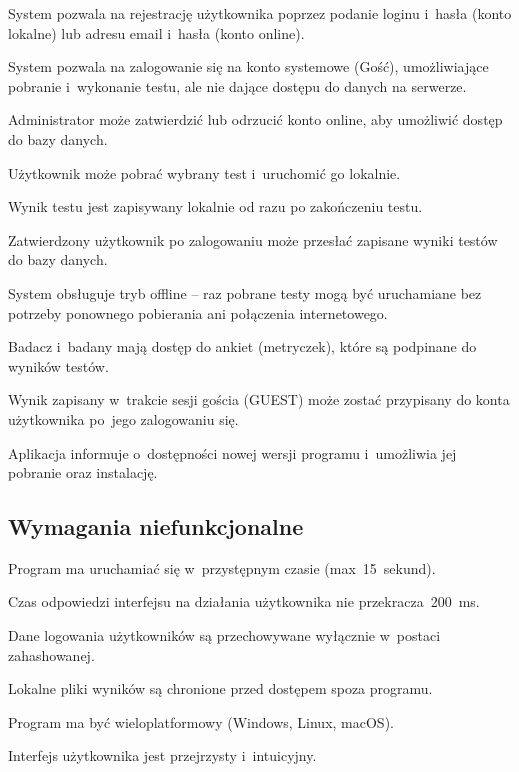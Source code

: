 \documentclass[12pt, a4paper, oneside]{report}
\begin{document}
\begin{description}[noitemsep]
	\item[WF1:] System pozwala na rejestrację użytkownika poprzez podanie loginu i~hasła (konto lokalne) lub adresu email i~hasła (konto online).
	\item[WF2:] System pozwala na zalogowanie się na konto systemowe (Gość), umożliwiające pobranie i~wykonanie testu, ale nie dające dostępu do danych na serwerze.
	\item[WF3:] Administrator może zatwierdzić lub odrzucić konto online, aby umożliwić dostęp do bazy danych.
	\item[WF4:] Użytkownik może pobrać wybrany test i~uruchomić go lokalnie.
	\item[WF5:] Wynik testu jest zapisywany lokalnie od razu po zakończeniu testu.
	\item[WF6:] Zatwierdzony użytkownik po zalogowaniu może przesłać zapisane wyniki testów do bazy danych.
	\item[WF7:] System obsługuje tryb offline -- raz pobrane testy mogą być uruchamiane bez potrzeby ponownego pobierania ani połączenia internetowego.
	\item[WF8:] Badacz i~badany mają dostęp do ankiet (metryczek), które są podpinane do wyników testów.
	\item[WF9:] Wynik zapisany w~trakcie sesji gościa (GUEST) może zostać przypisany do konta użytkownika po~jego zalogowaniu się.
	\item[WF10:] Aplikacja informuje o~dostępności nowej wersji programu i~umożliwia jej pobranie oraz instalację.
\end{description}

\subsection{Wymagania niefunkcjonalne}
\label{subsec:wym-niefunk}

\begin{description}[noitemsep]
	\item[WN1:] Program ma uruchamiać się w~przystępnym czasie (max~15~sekund).
	\item[WN2:] Czas odpowiedzi interfejsu na działania użytkownika nie przekracza~200~ms.
	\item[WN3:] Dane logowania użytkowników są przechowywane wyłącznie w~postaci zahashowanej.
	\item[WN4:] Lokalne pliki wyników są chronione przed dostępem spoza programu.
	\item[WN5:] Program ma być wieloplatformowy (Windows, Linux, macOS).
	\item[WN6:] Interfejs użytkownika jest przejrzysty i~intuicyjny.
\end{description}
\end{document}
